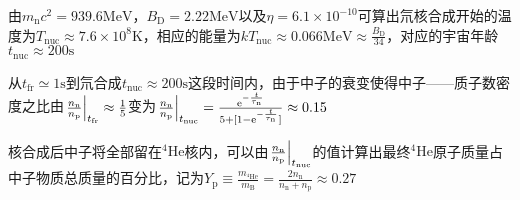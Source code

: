 \par 
由$m_{\text{n}} c^2 = 939.6 \mathrm{MeV}$，$B_{\text{D}} = 2.22 \mathrm{MeV}$以及$\eta = 6.1 \times 10^{-10}$可算出氘核合成开始的温度为$T_{\text{nuc}} \approx 7.6 \times 10^8 \mathrm{K}$，相应的能量为$k T_{\text{nuc}} \approx 0.066 \mathrm{MeV} \approx \frac{B_{\text{D}}}{34}$，对应的宇宙年龄$t_{\text{nuc}} \approx 200 \mathrm{s}$

\par 
从$t_{\text{fr}} \simeq 1 \mathrm{s}$到氘合成$t_{\text{nuc}} \approx 200 \mathrm{s}$这段时间内，由于中子的衰变使得中子——质子数密度之比由$\eval{\frac{n_{\text{n}}}{n_{\text{p}}}}_{t_{\text{fr}}} \approx \frac{1}{5}$变为$\eval{\frac{n_{\text{n}}}{n_{\text{p}}}}_{t_{\text{nuc}}} = \frac{\ee^{-\frac{t}{\tau_{\text{n}}}}}{5 + [1 - \ee^{-\frac{t}{\tau_{\text{n}}}}]} \approx 0.15$

\par 
核合成后中子将全部留在${}^4\text{He}$核内，可以由$\eval{\frac{n_{\text{n}}}{n_{\text{p}}}}_{t_{\text{nuc}}}$的值计算出最终${}^4\text{He}$原子质量占中子物质总质量的百分比，记为$Y_{\text{p}} \equiv \frac{m_{{}^4\text{He}}}{m_{\text{B}}} = \frac{2n_{\text{n}}}{n_{\text{n}} + n_{\text{p}}} \approx 0.27$

